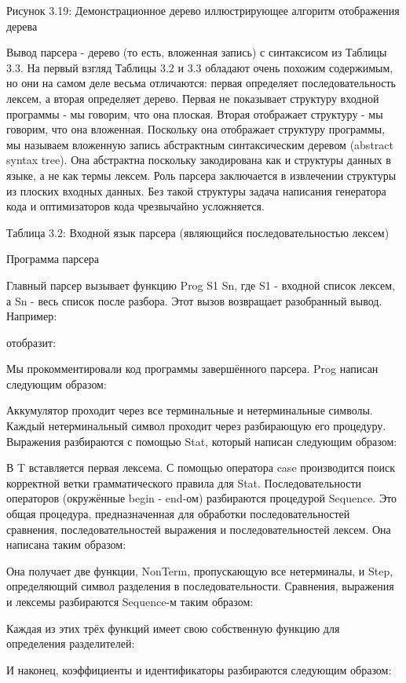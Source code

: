 Рисунок 3.19: Демонстрационное дерево иллюстрирующее алгоритм отображения дерева

Вывод парсера - дерево (то есть, вложенная запись) с синтаксисом из Таблицы 3.3. На первый взгляд Таблицы 3.2 и 3.3 обладают очень похожим содержимым, но они на самом деле весьма отличаются: первая определяет последовательность лексем, а вторая определяет дерево. Первая не показывает структуру входной программы - мы говорим, что она плоская. Вторая отображает структуру - мы говорим, что она вложенная. Поскольку она отображает структуру программы, мы называем вложенную запись абстрактным синтаксическим деревом (abstract syntax tree). Она абстрактна поскольку закодирована как и структуры данных в языке, а не как термы лексем. Роль парсера заключается в извлечении структуры из плоских входных данных. Без такой структуры задача написания генератора кода и оптимизаторов кода чрезвычайно усложняется.

Таблица 3.2: Входной язык парсера (являющийся последовательностью лексем)

Программа парсера

Главный парсер вызывает функцию {Prog S1 Sn}, где S1 - входной список лексем, а Sn - весь список после разбора. Этот вызов возвращает разобранный вывод. Например:

отобразит:

Мы прокомментировали код программы завершённого парсера. Prog написан следующим образом:

Аккумулятор проходит через все терминальные и нетерминальные символы. Каждый нетерминальный символ проходит через разбирающую его процедуру. Выражения разбираются с помощью Stat, который написан следующим образом:

В T вставляется первая лексема. С помощью оператора case производится поиск корректной ветки грамматического правила для Stat. Последовательности операторов (окружённые begin - end-ом) разбираются процедурой Sequence. Это общая процедура, предназначенная для обработки последовательностей сравнения, последовательностей выражения и последовательностей лексем. Она написана таким образом:

Она получает две функции, NonTerm, пропускающую все нетерминалы, и Step, определяющий символ разделения в последовательности. Сравнения, выражения и лексемы разбираются Sequence-м таким образом:

Каждая из этих трёх функций имеет свою собственную функцию для определения разделителей:

И наконец, коэффициенты и идентификаторы разбираются следующим образом:

